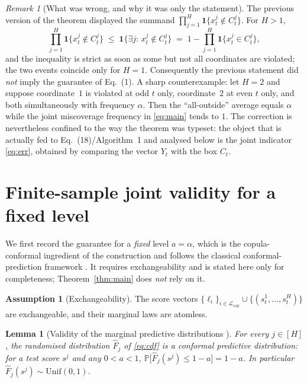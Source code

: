\documentclass[11pt]{article}
\newtheorem{lemma}[theorem]{Lemma}
\theoremstyle{definition}
\newtheorem{assumption}[theorem]{Assumption}
\theoremstyle{remark}
\newtheorem{remark}[theorem]{Remark}
\newcommand{\PR}{\mathbb{P}}
\newcommand{\ind}{\mathbf{1}}
\newcommand{\Lcop}{\mathcal{L}_{\mathrm{cop}}}
\newcommand{\horizon}{[H]}
\begin{document}
\begin{remark}[What was wrong, and why it was only the statement]
\label{rem:whatwaswrong}
The previous version of the theorem displayed the summand
$\prod_{j=1}^{H}\ind\{x_t^{j}\notin C_t^{j}\}$. For $H>1$,
\begin{equation}
  \prod_{j=1}^{H}\ind\bigl\{x_t^{j}\notin C_t^{j}\bigr\}
  \;\le\;
  \ind\bigl\{\exists j:\,x_t^{j}\notin C_t^{j}\bigr\}
  \;=\;1-\prod_{j=1}^{H}\ind\bigl\{x_t^{j}\in C_t^{j}\bigr\},
  \label{eq:strictineq}
\end{equation}
and the inequality is strict as soon as some but not all coordinates are
violated; the two events coincide only for $H=1$. Consequently the previous
statement did \emph{not} imply the guarantee of Eq.~(1). A sharp
counterexample: let $H=2$ and suppose coordinate~$1$ is violated at odd $t$
only, coordinate~$2$ at even $t$ only, and both simultaneously with frequency
$\alpha$. Then the ``all-outside'' average equals $\alpha$ while the joint
miscoverage frequency in \eqref{eq:main} tends to $1$. The correction is
nevertheless confined to the way the theorem was typeset: the object that is
actually fed to Eq.~(18)/Algorithm~1 and analysed below is the joint indicator
\eqref{eq:err}, obtained by comparing the vector $Y_t$ with the box $C_t$.
\end{remark}

\section{Finite-sample joint validity for a fixed level}
\label{sec:fixed}

We first record the guarantee for a \emph{fixed} level $a=\alpha$, which is the
copula-conformal ingredient of the construction and follows the classical
conformal-prediction framework \cite{vovk2005,sunyu2024}. It requires
exchangeability and is stated here only for completeness;
Theorem~\ref{thm:main} does \emph{not} rely on it.

\begin{assumption}[Exchangeability]
\label{ass:exch}
The score vectors $\{\ell_i\}_{i\in\Lcop}\cup\{(s_t^{1},\dots,s_t^{H})\}$ are
exchangeable, and their marginal laws are atomless.
\end{assumption}

\begin{lemma}[Validity of the marginal predictive distributions
\cite{vovk2017}]
\label{lem:vovk}
For every $j\in\horizon$, the randomised distribution $\widehat{F}_j$ of
\eqref{eq:cdf} is a conformal predictive distribution: for a test score
$s^{j}$ and any $0<a<1$,
$\PR\bigl[\widehat{F}_j(s^{j})\le 1-a\bigr]=1-a$. In particular
$\widehat{F}_j(s^{j})\sim\mathrm{Unif}(0,1)$.
\end{lemma}
\end{document}
